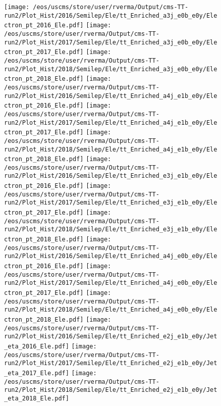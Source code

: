 \begin{figure}
\centering
\texttt{[image: /eos/uscms/store/user/rverma/Output/cms-TT-run2/Plot\_Hist/2016/Semilep/Ele/tt\_Enriched\_a3j\_e0b\_e0y/Electron\_pt\_2016\_Ele.pdf]}
\texttt{[image: /eos/uscms/store/user/rverma/Output/cms-TT-run2/Plot\_Hist/2017/Semilep/Ele/tt\_Enriched\_a3j\_e0b\_e0y/Electron\_pt\_2017\_Ele.pdf]}
\texttt{[image: /eos/uscms/store/user/rverma/Output/cms-TT-run2/Plot\_Hist/2018/Semilep/Ele/tt\_Enriched\_a3j\_e0b\_e0y/Electron\_pt\_2018\_Ele.pdf]}
\texttt{[image: /eos/uscms/store/user/rverma/Output/cms-TT-run2/Plot\_Hist/2016/Semilep/Ele/tt\_Enriched\_a4j\_e1b\_e0y/Electron\_pt\_2016\_Ele.pdf]}
\texttt{[image: /eos/uscms/store/user/rverma/Output/cms-TT-run2/Plot\_Hist/2017/Semilep/Ele/tt\_Enriched\_a4j\_e1b\_e0y/Electron\_pt\_2017\_Ele.pdf]}
\texttt{[image: /eos/uscms/store/user/rverma/Output/cms-TT-run2/Plot\_Hist/2018/Semilep/Ele/tt\_Enriched\_a4j\_e1b\_e0y/Electron\_pt\_2018\_Ele.pdf]}
\texttt{[image: /eos/uscms/store/user/rverma/Output/cms-TT-run2/Plot\_Hist/2016/Semilep/Ele/tt\_Enriched\_e3j\_e1b\_e0y/Electron\_pt\_2016\_Ele.pdf]}
\texttt{[image: /eos/uscms/store/user/rverma/Output/cms-TT-run2/Plot\_Hist/2017/Semilep/Ele/tt\_Enriched\_e3j\_e1b\_e0y/Electron\_pt\_2017\_Ele.pdf]}
\texttt{[image: /eos/uscms/store/user/rverma/Output/cms-TT-run2/Plot\_Hist/2018/Semilep/Ele/tt\_Enriched\_e3j\_e1b\_e0y/Electron\_pt\_2018\_Ele.pdf]}
\texttt{[image: /eos/uscms/store/user/rverma/Output/cms-TT-run2/Plot\_Hist/2016/Semilep/Ele/tt\_Enriched\_a4j\_e0b\_e0y/Electron\_pt\_2016\_Ele.pdf]}
\texttt{[image: /eos/uscms/store/user/rverma/Output/cms-TT-run2/Plot\_Hist/2017/Semilep/Ele/tt\_Enriched\_a4j\_e0b\_e0y/Electron\_pt\_2017\_Ele.pdf]}
\texttt{[image: /eos/uscms/store/user/rverma/Output/cms-TT-run2/Plot\_Hist/2018/Semilep/Ele/tt\_Enriched\_a4j\_e0b\_e0y/Electron\_pt\_2018\_Ele.pdf]}
\texttt{[image: /eos/uscms/store/user/rverma/Output/cms-TT-run2/Plot\_Hist/2016/Semilep/Ele/tt\_Enriched\_e2j\_e1b\_e0y/Jet\_eta\_2016\_Ele.pdf]}
\texttt{[image: /eos/uscms/store/user/rverma/Output/cms-TT-run2/Plot\_Hist/2017/Semilep/Ele/tt\_Enriched\_e2j\_e1b\_e0y/Jet\_eta\_2017\_Ele.pdf]}
\texttt{[image: /eos/uscms/store/user/rverma/Output/cms-TT-run2/Plot\_Hist/2018/Semilep/Ele/tt\_Enriched\_e2j\_e1b\_e0y/Jet\_eta\_2018\_Ele.pdf]}
\end{figure}

